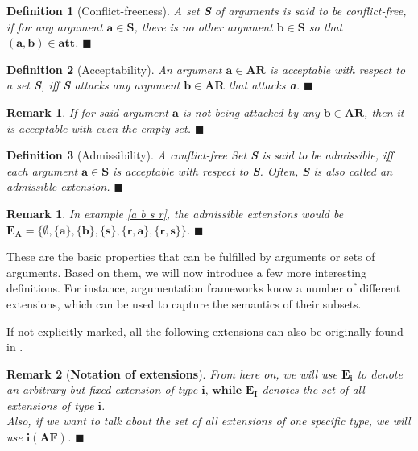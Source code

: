 \documentclass[12pt]{report}
\numberwithin{figure}{chapter}
\theoremstyle{break}
\newtheorem{defn}{Definition}[chapter]
\newtheorem*{rmrk}{Remark}
\newtheorem*{frmrk}{Remark}
\newenvironment{mydefn}{\begin{defn}}{$\blacksquare$ \end{defn}}
\newenvironment{myrmrk}{\begin{rmrk}}{$\blacksquare$ \end{rmrk}}
\newenvironment{myfrmrk}{\begin{frmrk}}{$\blacksquare$ \end{frmrk}}
\begin{document}
\begin{mydefn}[Conflict-freeness]
A set \textbf{S} of arguments is said to be conflict-free, if for any argument $\bm{a \in S}$, there is no other argument $\bm{b \in S}$ so that $\bm{(a,b) \in att}$.
\end{mydefn}

\begin{mydefn}[Acceptability]
An argument $\bm{a \in AR}$ is acceptable with respect to a set \textbf{S}, iff \textbf{S} attacks any argument $\bm{b \in AR}$ that attacks \textbf{a}. 
\end{mydefn}

\begin{myfrmrk}
If for said argument $\bm{a}$ is not being attacked by any $\bm{b \in AR}$, then it is acceptable with even the empty set.
\end{myfrmrk}

\begin{mydefn}[Admissibility]
A conflict-free Set \textbf{S} is said to be admissible, iff each argument $\bm{a \in S}$ is acceptable with respect to \textbf{S}.
Often, \textbf{S} is also called an admissible extension.
\label{admissible}
\end{mydefn}
\begin{myrmrk}
In example \ref{a b s r}, the admissible extensions would be $\bm{E_A = \{\emptyset,\{a\},\{b\},\{s\},\{r,a\},\{r,s\}\}}$. 
\end{myrmrk}

These are the basic properties that can be fulfilled by arguments or sets of arguments. Based on them, we will now introduce a few more interesting definitions.
For instance, argumentation frameworks know a number of different extensions, which can be used to capture the semantics of their subsets. 

\newpage
If not explicitly marked, all the following extensions can also be originally found in \cite{Dung}.

\begin{myrmrk}[\textbf{Notation of extensions}]
From here on, we will use $\bm{E_{i}}$ to denote an arbitrary but fixed extension of type $\bm{i \text{, while } E_{I}}$ denotes the set of all extensions of type $\bm{i}$.\\
Also, if we want to talk about the set of all extensions of one specific type, we will use $\bm{i(AF)}$.
\end{myrmrk}
\end{document}
